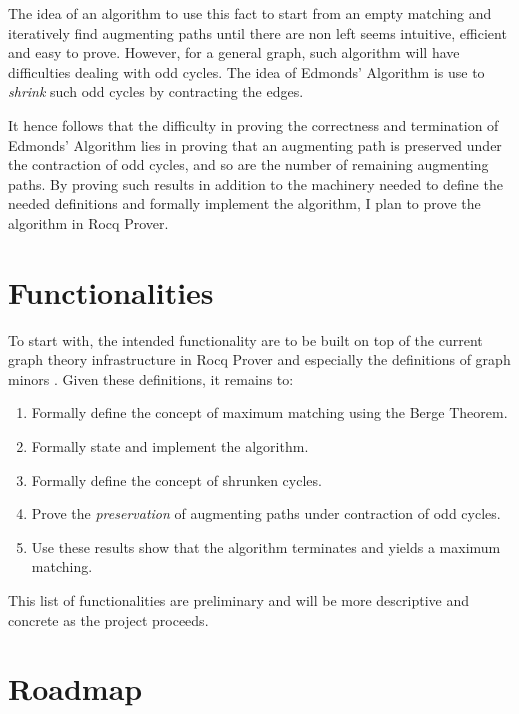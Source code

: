 \documentclass[acmsmall, screen, nonacm]{acmart}
\begin{document}
The idea of an algorithm to use this fact to start from an empty matching and iteratively find augmenting paths until there are non left seems intuitive, efficient and easy to prove. However, for a general graph, such algorithm will have difficulties dealing with odd cycles. The idea of Edmonds' Algorithm is use to \textit{shrink} such odd cycles by contracting the edges. 

It hence follows that the difficulty in proving the correctness and termination of Edmonds' Algorithm lies in proving that an augmenting path is preserved under the contraction of odd cycles, and so are the number of remaining augmenting paths. By proving such results in addition to the machinery needed to define the needed definitions and formally implement the algorithm, I plan to prove the algorithm in Rocq Prover.

\section{Functionalities}

To start with, the intended functionality are to be built on top of the current graph theory infrastructure in Rocq Prover and especially the definitions of graph minors \cite{CoqGraph}. Given these definitions, it remains to:
\begin{enumerate}
	\item Formally define the concept of maximum matching using the Berge Theorem.
	\item Formally state and implement the algorithm.
	\item Formally define the concept of shrunken cycles.
	\item Prove the \textit{preservation} of augmenting paths under contraction of odd cycles.
	\item Use these results show that the algorithm terminates and yields a maximum matching.
\end{enumerate}

This list of functionalities are preliminary and will be more descriptive and concrete as the project proceeds.

\section{Roadmap}




{}
\end{document}
